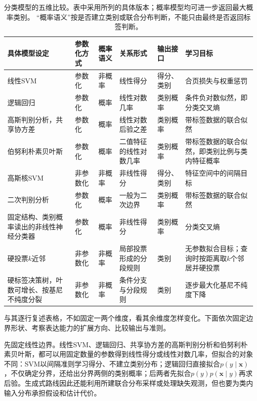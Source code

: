 \begin{table}[htbp]
  \centering
  \footnotesize
  \setlength{\tabcolsep}{4pt}
  \renewcommand{\arraystretch}{1.25}
  \begin{tabularx}{\linewidth}{@{}>{\raggedright\arraybackslash}p{28mm}>{\raggedright\arraybackslash}p{20mm}>{\raggedright\arraybackslash}p{14mm}>{\raggedright\arraybackslash}p{22mm}>{\raggedright\arraybackslash}p{20mm}>{\raggedright\arraybackslash}X@{}}
    \toprule
    \textbf{具体模型设定} & \textbf{参数化方式} & \textbf{概率语义} & \textbf{关系形式} & \textbf{输出接口} & \textbf{学习目标} \\
    \midrule
    线性SVM & 参数化 & 非概率 & 线性得分 & 得分、类别 & 合页损失与权重惩罚 \\
    逻辑回归 & 参数化 & 概率 & 线性对数几率 & 类别概率 & 条件负对数似然，即分类交叉熵 \\
    高斯判别分析，共享协方差 & 参数化 & 概率 & 线性对数后验之差 & 类别概率 & 带标签数据的联合似然 \\
    伯努利朴素贝叶斯 & 参数化 & 概率 & 二值特征的线性对数几率 & 类别概率 & 带标签数据的联合似然，即类别比例与类内特征概率 \\
    高斯核SVM & 非参数化 & 非概率 & 非线性得分 & 得分、类别 & 特征空间中的间隔目标 \\
    二次判别分析 & 参数化 & 概率 & 一般为二次边界 & 类别概率 & 带标签数据的联合似然 \\
    固定结构、类别概率读出的非线性神经分类器 & 参数化 & 概率 & 非线性得分 & 类别概率 & 分类交叉熵 \\
    硬投票$k$近邻 & 非参数化 & 非概率 & 局部投票形成的分段规则 & 类别 & 无参数拟合目标；查询时按距离取$k$个邻居并硬投票 \\
    硬标签决策树，叶数可增长、按基尼不纯度分裂 & 非参数化 & 非概率 & 条件分支与分段规则 & 类别 & 逐步最大化基尼不纯度下降 \\
    \bottomrule
  \end{tabularx}
  \caption{分类模型的五维比较。表中采用所列的具体版本；概率模型均可进一步返回最大概率类别。
  “概率语义”按是否建立类别或联合分布判断，不能只由最终是否返回标签判断。}
  \label{tab:models-classifiers}
\end{table}

与其逐行复述表格，不如固定一两个维度，看其余维度怎样变化。下面依次固定边界形状、考察表达能力的扩展方向、比较输出与准则。

先固定线性边界。线性SVM、逻辑回归、共享协方差的高斯判别分析和伯努利朴素贝叶斯，都可以用固定数量的参数得到线性得分或线性对数几率，但拟合的对象不同：SVM以间隔准则学习得分、不建立类别分布；逻辑回归直接拟合$p(y\mid\bm{x})$，不仅确定分界，还给出分界两侧的类别概率；后两者先拟合$p(y)p(\bm{x}\mid y)$再求后验。生成式路线因此还能利用所建联合分布采样或处理缺失观测，但也要为类内输入分布承担假设和估计代价。

